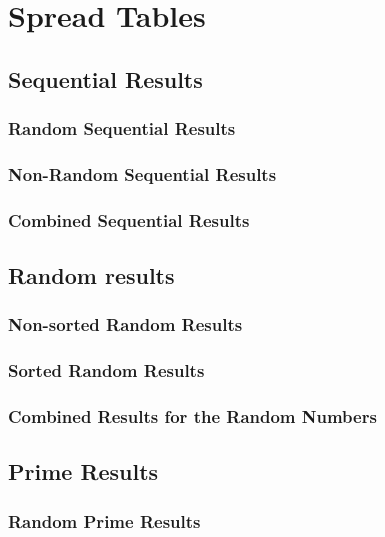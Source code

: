 \section{Spread Tables}
\label{spread_tables}
\subsection{Sequential Results}
\subsubsection{Random Sequential Results}


\subsubsection{Non-Random Sequential Results}


\subsubsection{Combined Sequential Results}


\subsection{Random results}
\label{random_results}
\subsubsection{Non-sorted Random Results}


\subsubsection{Sorted Random Results}

\subsubsection{Combined Results for the Random Numbers}


\subsection{Prime Results}
\subsubsection{Random Prime Results}


